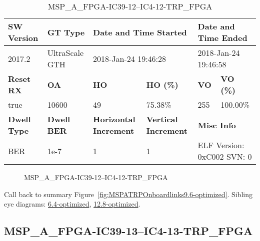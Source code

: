 \begin{table}[h]
\centering
\caption{MSP\_A\_FPGA-IC39-12--IC4-12-TRP\_FPGA}
\label{tab:MSPAFPGAIC3912IC412TRPFPGA9.6-optimized}
\begin{tabular}{@{}|l|l|l|l|l|l|@{}}
\toprule
\textbf{SW Version}                & \textbf{GT Type}   & \multicolumn{2}{l|}{\textbf{Date and Time Started}}            & \multicolumn{2}{l|}{\textbf{Date and Time Ended}}        \\ \midrule
2017.2                       & UltraScale GTH          & \multicolumn{2}{l|}{2018-Jan-24 19:46:28}                   & \multicolumn{2}{l|}{2018-Jan-24 19:46:58}               \\ \midrule
\textbf{Reset RX}                  & \textbf{OA} & \textbf{HO}   & \textbf{HO (\%)} & \textbf{VO} & \textbf{VO (\%)} \\ \midrule
true & 10600        & 49          & 75.38\%        & 255        & 100.00\%       \\ \midrule
\textbf{Dwell Type}                & \textbf{Dwell BER} & \textbf{Horizontal Increment} & \textbf{Vertical Increment}    & \multicolumn{2}{l|}{\textbf{Misc Info}}                  \\ \midrule
BER                            & 1e-7        & 1        & 1           & \multicolumn{2}{l|}{ELF Version: 0xC002 SVN: 0}                         \\ \bottomrule
\end{tabular}
\end{table}

\begin{figure}[h]
\caption{MSP\_A\_FPGA-IC39-12--IC4-12-TRP\_FPGA} \label{fig:MSPAFPGAIC3912IC412TRPFPGA9.6-optimized}
\end{figure}

Call back to summary Figure~\ref{fig:MSPATRPOnboardlinks9.6-optimized}.
Sibling eye diagrams: \hyperref[sec:MSPAFPGAIC3912IC412TRPFPGA6.4-optimized]{6.4-optimized}, \hyperref[sec:MSPAFPGAIC3912IC412TRPFPGA12.8-optimized]{12.8-optimized}.

\clearpage
\newpage


\subsection{MSP\_A\_FPGA-IC39-13--IC4-13-TRP\_FPGA}\label{sec:MSPAFPGAIC3913IC413TRPFPGA9.6-optimized}


